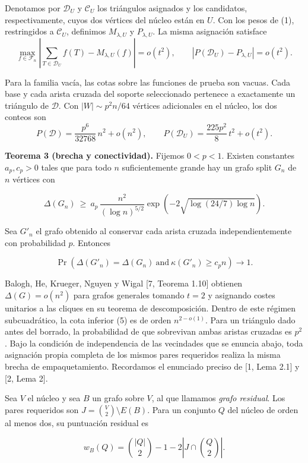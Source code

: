 \documentclass[spanish,11pt,a4paper]{article}
\begin{document}
Denotamos por \(\mathcal D_U\) y \(\mathcal C_U\) los triángulos asignados y los candidatos, respectivamente, cuyos dos vértices del núcleo están en \(U\). Con los pesos de (1), restringidos a \(\mathcal C_U\), definimos \(M_{\lambda,U}\) y \(P_{\lambda,U}\). La misma asignación satisface \[\max_{f\in\mathcal F_n}\left|\sum_{T\in\mathcal D_U}f(T)-M_{\lambda,U}(f)\right|=o(t^2),
\qquad |P(\mathcal D_U)-P_{\lambda,U}|=o(t^2).
\tag{3}\]

Para la familia vacía, las cotas sobre las funciones de prueba son vacuas. Cada base y cada arista cruzada del soporte seleccionado pertenece a exactamente un triángulo de \(\mathcal D\). Con \(|W|\sim p^2n/64\) vértices adicionales en el núcleo, los dos conteos son \[P(\mathcal D)=\frac{p^6}{32768}\,n^2+o(n^2),
\qquad
P(\mathcal D_U)=\frac{225p^2}{8}\,t^2+o(t^2).
\tag{4}\]

\textbf{Teorema 3 (brecha y conectividad).} Fijemos \(0<p<1\). Existen constantes \(a_p,c_p>0\) tales que para todo \(n\) suficientemente grande hay un grafo split \(G_n\) de \(n\) vértices con

\[\Delta(G_n)\ \ge\ a_p\,\frac{n^2}{(\log n)^{5/2}}
  \exp\!\left(-2\sqrt{\log(24/7)\log n}\right).
\tag{5}\]

Sea \(G'_n\) el grafo obtenido al conservar cada arista cruzada independientemente con probabilidad \(p\). Entonces

\[\Pr\!\left(\Delta(G'_n)=\Delta(G_n)
             \ \text{and}\ \kappa(G'_n)\ge c_p n\right)\longrightarrow 1.
\tag{6}\]

Balogh, He, Krueger, Nguyen y Wigal {[}7, Teorema 1.10{]} obtienen \(\Delta(G)=o(n^2)\) para grafos generales tomando \(t=2\) y asignando costes unitarios a las cliques en su teorema de descomposición. Dentro de este régimen subcuadrático, la cota inferior (5) es de orden \(n^{2-o(1)}\). Para un triángulo dado antes del borrado, la probabilidad de que sobrevivan ambas aristas cruzadas es \(p^2\). Bajo la condición de independencia de las vecindades que se enuncia abajo, toda asignación propia completa de los mismos pares requeridos realiza la misma brecha de empaquetamiento. Recordamos el enunciado preciso de {[}1, Lema 2.1{]} y {[}2, Lema 2{]}.

Sea \(V\) el núcleo y sea \(B\) un grafo sobre \(V\), al que llamamos \emph{grafo residual}. Los pares requeridos son \(J=\binom V2\setminus E(B)\). Para un conjunto \(Q\) del núcleo de orden al menos dos, su puntuación residual es

\[w_B(Q)=\binom{|Q|}{2}-1-2\left|J\cap\binom Q2\right|.\]
\end{document}
